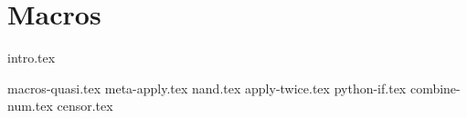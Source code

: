 \documentclass{exam}
\begin{document}
\section{Macros}
{intro.tex}
\begin{questions}
{macros-quasi.tex}
{meta-apply.tex}
{nand.tex}
{apply-twice.tex}
{python-if.tex}
{combine-num.tex}
{censor.tex}
\end{questions}
\end{document}
